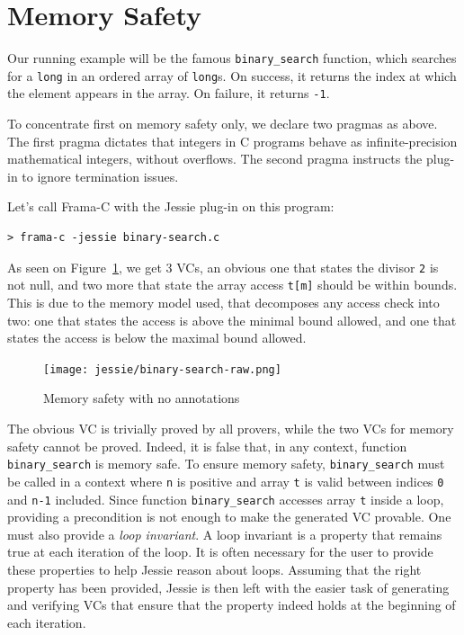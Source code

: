 \documentclass[a4paper,11pt,twoside,openright]{report}
\begin{document}
\section{Memory Safety}

Our running example will be the famous \verb|binary_search| function,
which searches for a {\tt long} in an ordered array of {\tt long}s. On
success, it returns the index at which the element appears in the
array. On failure, it returns \verb|-1|.



To concentrate first on memory safety only, we declare two pragmas as
above. The first pragma dictates that integers in C programs behave as
infinite-precision mathematical integers, without overflows. The
second pragma instructs the plug-in to ignore termination issues.

Let's call Frama-C with the Jessie plug-in on this program:

\begin{verbatim}
> frama-c -jessie binary-search.c
\end{verbatim}

As seen on Figure~\ref{fig:raw}, we get 3 VCs, an obvious one that
states the divisor \verb|2| is not null, and two more that state the
array access \verb|t[m]| should be within bounds. This is due to the
memory model used, that decomposes any access check into two: one that
states the access is above the minimal bound allowed, and one that
states the access is below the maximal bound allowed.

\begin{figure}[t]
  \begin{center}
  \texttt{[image: jessie/binary-search-raw.png]}
  \end{center}
  \caption{Memory safety with no annotations}
  \label{fig:raw}
  \hrulefill
\end{figure}

The obvious VC is trivially proved by all provers, while the two VCs
for memory safety cannot be proved. Indeed, it is false that, in any
context, function \verb|binary_search| is memory safe. To ensure
memory safety, \verb|binary_search| must be called in a context 
where \verb|n| is positive and array \verb|t| is valid
between indices \verb|0| and \verb|n-1| included. Since function
\verb|binary_search| accesses array \verb|t| inside a loop, 
providing a precondition is not
enough to make the generated VC provable.
One must also provide a {\em loop invariant}. A loop invariant
is a property that remains true at each iteration of the loop.
It is often necessary for the user to provide these properties
to help Jessie reason about loops. Assuming that the right property
has been provided, Jessie is then left with the easier task of
generating and verifying VCs that ensure that the property indeed
holds at the beginning of each iteration.
\end{document}
